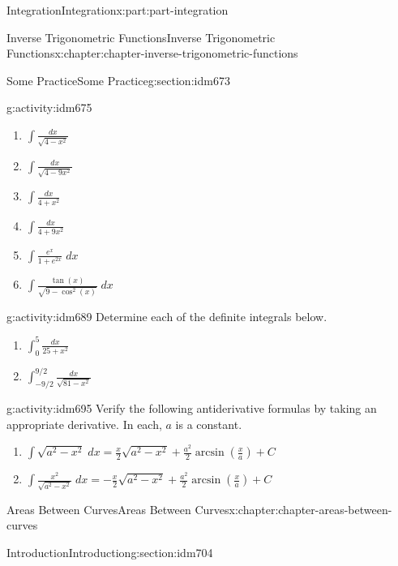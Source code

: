 \documentclass[oneside,10pt,]{book}
\numberwithin{equation}{section}
\begin{document}
\begin{partptx}{Integration}{}{Integration}{}{}{x:part:part-integration}
\begin{chapterptx}{Inverse Trigonometric Functions}{}{Inverse Trigonometric Functions}{}{}{x:chapter:chapter-inverse-trigonometric-functions}
\begin{sectionptx}{Some Practice}{}{Some Practice}{}{}{g:section:idm673}
\begin{activity}{}{g:activity:idm675}
\begin{enumerate}[font=\bfseries,label=(\alph*),ref=\alph*]
\item{}\(\displaystyle \int \frac{dx}{\sqrt{4-x^2}}\)\item{}\(\displaystyle \int \frac{dx}{\sqrt{4-9x^2}}\)\item{}\(\displaystyle \int \frac{dx}{4+x^2}\)\item{}\(\displaystyle \int \frac{dx}{4+9x^2}\)\item{}\(\displaystyle \int \frac{e^x}{1 + e^{2x}}\;dx\)\item{}\(\displaystyle \int \frac{\tan(x)}{\sqrt{9-\cos^2(x)}}\;dx\)\end{enumerate}
\end{activity}
\begin{activity}{}{g:activity:idm689}%
Determine each of the definite integrals below.\begin{enumerate}[font=\bfseries,label=(\alph*),ref=\alph*]
\item{}\(\displaystyle\int_0^{5} \frac{dx}{25 + x^2}\)\item{}\(\displaystyle\int_{-9/2}^{9/2} \frac{dx}{\sqrt{81 - x^2}}\)\end{enumerate}
\end{activity}
\begin{activity}{}{g:activity:idm695}%
Verify the following antiderivative formulas by taking an appropriate derivative. In each, \(a\) is a constant.\begin{enumerate}[font=\bfseries,label=(\alph*),ref=\alph*]
\item{}\(\displaystyle \int \sqrt{a^2-x^2}\;dx = \frac{x}{2}\sqrt{a^2-x^2} + \frac{a^2}{2}\arcsin\left(\frac{x}{a}\right) + C\)\item{}\(\displaystyle \int \frac{x^2}{\sqrt{a^2-x^2}}\;dx = -\frac{x}{2}\sqrt{a^2-x^2} + \frac{a^2}{2}\arcsin\left(\frac{x}{a}\right) + C\)\end{enumerate}
\end{activity}
\end{sectionptx}
\end{chapterptx}
%
\typeout{************************************************}
\typeout{************************************************}
%
\begin{chapterptx}{Areas Between Curves}{}{Areas Between Curves}{}{}{x:chapter:chapter-areas-between-curves}
%
%
\typeout{************************************************}
\typeout{************************************************}
%
\begin{sectionptx}{Introduction}{}{Introduction}{}{}{g:section:idm704}

\end{sectionptx}
\end{chapterptx}
\end{partptx}
\end{document}

